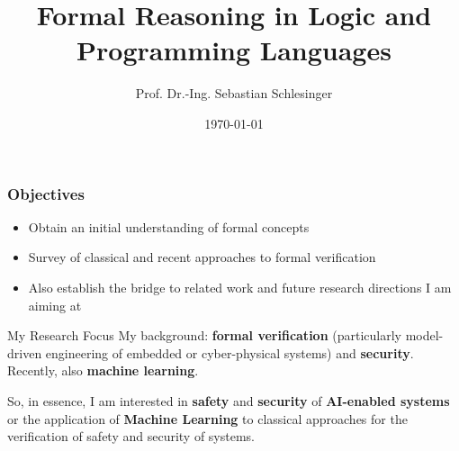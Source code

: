 \documentclass{beamer}
\title[Methodenwerkstatt Statistik]{Formal Reasoning in Logic and Programming Languages}
\author[Sebastian Schlesinger]{Prof. Dr.-Ing. Sebastian Schlesinger}
\institute[HWR Berlin]{Berlin School for Economics and Law}
\date{\today}
\begin{document}
 \begin{frame}
\titlepage
\end{frame}
\begin{frame}
\frametitle{Objectives}
\begin{itemize}
\item Obtain an initial understanding of formal concepts
\item Survey of classical and recent approaches to formal verification
\item Also establish the bridge to related work and future research directions I am aiming at
 
\end{itemize}

\end{frame}
\begin{frame}{My Research Focus}
  My background: \textbf{formal verification} (particularly model-driven engineering of embedded or cyber-physical systems) and \textbf{security}. 
  Recently, also \textbf{machine learning}. 

  So, in essence, I am interested in \textbf{safety} and \textbf{security} of \textbf{AI-enabled systems} or the application of \textbf{Machine Learning} to classical approaches for the verification of safety and security of systems.
  \begin{center}
\end{center}
\end{frame}
\end{document}
